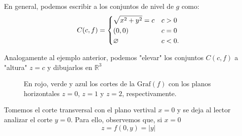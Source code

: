 \begin{example}
   En general, podemos escribir a los conjuntos de nivel de $g$ como:
       \[
            C(c,f)=
            \begin{dcases}
            \sqrt{ x^2+y^2}=c  &  c>0 \\
    (0,0)  & c=0\\
    \varnothing  & c<0.\\
            \end{dcases}
        \]
   

Analogamente al ejemplo anterior, podemos "elevar"  los  conjuntos $ C(c,f)$  a "altura"  $z=c$ y dibujarlos en  $\mathbb{R}^{3}$
 \begin{figure}[H]
\begin{center}
        \end{center}
\caption{En rojo,  verde y azul  los cortes de la $\text{Graf}(f)$  con los planos horizontales $z=0$, $z=1$ y $z=2$, respectivamente.}
  \end{figure}

Tomemos el corte transversal con el plano vertival $x=0$ y se deja al lector analizar el corte  $y=0.$  Para ello, observemos que, si $x=0$
$$z= f(0,y)=|y|$$


\end{example}
